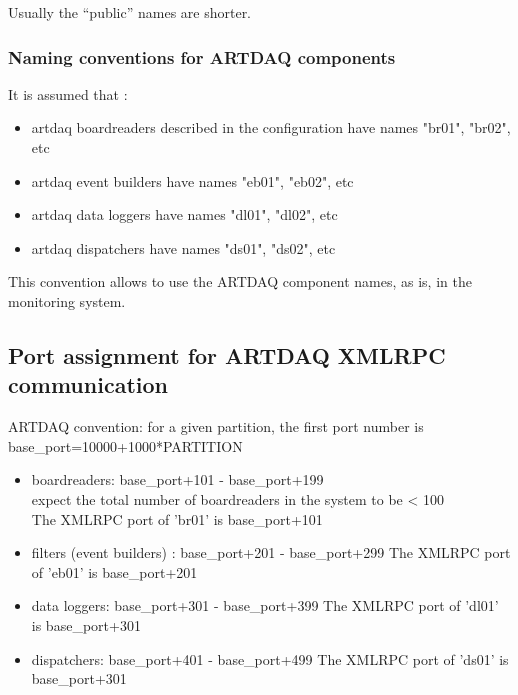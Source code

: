Usually the ``public'' names are shorter.


\subsubsection{Naming conventions for ARTDAQ components}

It is assumed that :
\begin{itemize}
\item 
  artdaq boardreaders described in the configuration have names "br01", "br02", etc
\item 
  artdaq event builders have names "eb01", "eb02", etc
\item 
  artdaq data loggers have names "dl01", "dl02", etc
\item 
  artdaq dispatchers have names "ds01", "ds02", etc
\end{itemize}

This convention allows to use the ARTDAQ component names, as is, in the monitoring system.

\subsection{Port assignment for ARTDAQ XMLRPC communication}

ARTDAQ convention: for a given partition, the first port number is base\_port=10000+1000*PARTITION
\begin{itemize}
\item
  boardreaders: base\_port+101 - base\_port+199\\
  expect the total number of boardreaders in the system to be < 100 \\
  The XMLRPC port of 'br01' is base\_port+101
\item
  filters (event builders) : base\_port+201 - base\_port+299
  The XMLRPC port of 'eb01' is base\_port+201
\item
  data loggers: base\_port+301 - base\_port+399
  The XMLRPC port of 'dl01' is base\_port+301
\item
  dispatchers: base\_port+401 - base\_port+499
  The XMLRPC port of 'ds01' is base\_port+301
\end{itemize}


